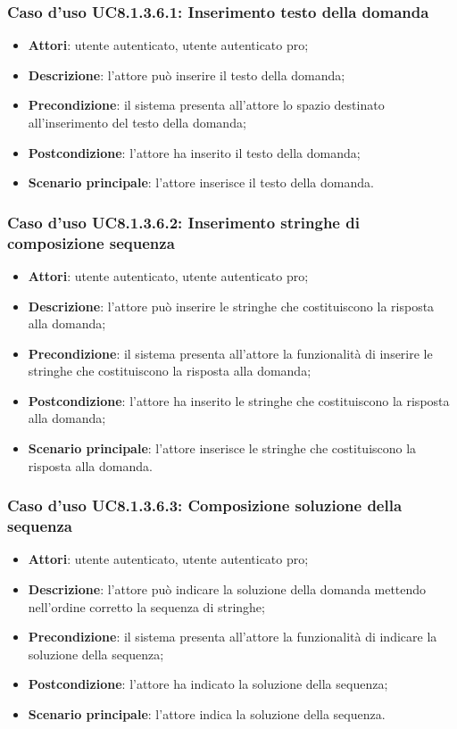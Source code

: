 \subsubsection{Caso d'uso UC8.1.3.6.1: Inserimento testo della domanda}
	\begin{itemize}
		\item \textbf{Attori}: utente autenticato, utente autenticato pro;
		\item \textbf{Descrizione}: l'attore può inserire il testo della domanda;
		\item\textbf{Precondizione}: il sistema presenta all'attore lo spazio destinato all'inserimento del testo della domanda;
		\item \textbf{Postcondizione}: l'attore ha inserito il testo della domanda;
		\item\textbf{Scenario principale}: l'attore inserisce il testo della domanda.
	\end{itemize}
	
\subsubsection{Caso d'uso UC8.1.3.6.2: Inserimento stringhe di composizione sequenza}
	\begin{itemize}
		\item \textbf{Attori}: utente autenticato, utente autenticato pro;
		\item \textbf{Descrizione}: l'attore può inserire le stringhe che costituiscono la risposta alla domanda;
		\item\textbf{Precondizione}: il sistema presenta all'attore la funzionalità di inserire le stringhe che costituiscono la risposta alla domanda;
		\item \textbf{Postcondizione}: l'attore ha inserito le stringhe che costituiscono la risposta alla domanda;
		\item\textbf{Scenario principale}: l'attore inserisce le stringhe che costituiscono la risposta alla domanda.
	\end{itemize}
	
\subsubsection{Caso d'uso UC8.1.3.6.3: Composizione soluzione della sequenza}
	\begin{itemize}
		\item \textbf{Attori}: utente autenticato, utente autenticato pro;
		\item \textbf{Descrizione}: l'attore può indicare la soluzione della domanda mettendo nell'ordine corretto la sequenza di stringhe;
		\item\textbf{Precondizione}: il sistema presenta all'attore la funzionalità di indicare la soluzione della sequenza;
		\item \textbf{Postcondizione}: l'attore ha indicato la soluzione della sequenza;
		\item\textbf{Scenario principale}: l'attore indica la soluzione della sequenza. 
	\end{itemize}
